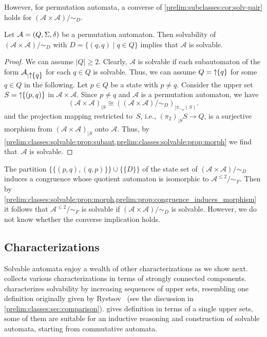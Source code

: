 However, for permutation automata,
a converse of \cref{prelim:subclasses:cor:solv-pair} holds
for $( \mathcal A \times \mathcal A ) / {\sim_D}$.

\begin{proposition} \label{prelim:classes:solv:prop:perm-product-solv-implies-solv}
	Let $\mathcal A = (Q, \Sigma, \delta)$ be a permutation automaton.
	Then solvability of $( \mathcal A \times \mathcal A ) / {\sim_D}$ with $D = \{ (q,q) \mid q \in Q \}$
	implies that $\mathcal A$ is solvable.	
\end{proposition}
\begin{proof}
	We can assume $|Q| \ge 2$.
	Clearly, $\mathcal A$ is solvable
	if each subautomaton of the form $\mathcal A_{|\mbox{\ensuremath{\displaystyle \uparrow \!\!\{q\}}}}$
	for each $q \in Q$ is solvable.
	Thus, we can assume $Q = \mbox{\ensuremath{\displaystyle \uparrow \!\!\{q\}}}$ for some $q \in Q$
	in the following.
	Let $p \in Q$ be a state with $p \ne q$.
	Consider the upper set $S = \mbox{\ensuremath{\displaystyle \uparrow \!\!\{(p, q)\}}}$
	in $\mathcal A \times \mathcal A$.
	Since $p \ne q$ and $\mathcal A$ is a permutation automaton, we have
	\[
	( \mathcal A \times \mathcal A )_{|S} \cong \left( (\mathcal A \times \mathcal A) / {\sim_D} \right)_{|\pi_{\sim_D}(S)}.
	\]
	and the projection mapping restricted to~$S$, i.e., $(\pi_2)_{|S} S \to Q$,
	is a surjective morphism from $ ( \mathcal A \times \mathcal A )_{|S}$
	onto $\mathcal A$.
	Thus, by \cref{prelim:classes:solvable:prop:subaut,prelim:classes:solvable:prop:morph} 
	we find that~$\mathcal A$ is solvable.	
\end{proof}

The partition $\{ \{ (p,q), (q, p) \} \} \cup \{ \{ D \} \}$
of the state set of $(\mathcal A \times \mathcal A ) / {\sim_D}$
induces a congruence whose quotient automaton
is isomorphic to $\mathcal A^{\le 2} / {\sim_F}$. 
Then by \cref{prelim:classes:solvable:prop:morph,prelim:prop:congruence_induces_morphism}
it follows that $\mathcal A^{\le 2} / {\sim_F}$
is solvable if $(\mathcal A \times \mathcal A ) / {\sim_D}$ is solvable.
However, we do not know whether the converse implication holds.

\subsection{Characterizations}
\label{prelim:classes:sec:solvable:char}

Solvable automata enjoy a wealth of other characterizations
as we show next.  
collects various characterizations in terms of strongly
connected components.  
characterizes solvability by increasing sequences of upper
sets, resembling one definition originally given by Rystsov~\cite{Rystsov97} 
(see the discussion in \cref{prelim:classes:sec:comparison}).
gives definition in terms of a single upper sets,
some of them are suitable for an inductive reasoning and construction
of solvable automata, starting from commutative automata.

